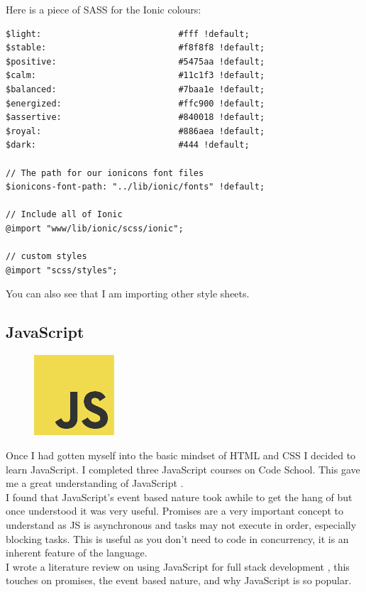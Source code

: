 Here is a piece of SASS for the Ionic colours:
\begin{verbatim}
$light:                           #fff !default;
$stable:                          #f8f8f8 !default;
$positive:                        #5475aa !default; 
$calm:                            #11c1f3 !default;
$balanced:                        #7baa1e !default; 
$energized:                       #ffc900 !default;
$assertive:                       #840018 !default;
$royal:                           #886aea !default;
$dark:                            #444 !default;

// The path for our ionicons font files
$ionicons-font-path: "../lib/ionic/fonts" !default;

// Include all of Ionic
@import "www/lib/ionic/scss/ionic";

// custom styles
@import "scss/styles";
\end{verbatim}
You can also see that I am importing other style sheets.


\subsection{JavaScript}
\begin{figure}
\includegraphics[width=3cm]{img/mobile-app/logos/JS.png}
\end{figure} 
Once I had gotten myself into the basic mindset of HTML and CSS I decided to learn JavaScript.
I completed three JavaScript courses \cite{codeschool_js} on Code  School.
This gave me a great understanding of JavaScript \cite{javascript}.
\\
I found that JavaScript's event based nature took awhile to get the hang of but once understood it was very useful. 
Promises are a very important concept to understand as JS is asynchronous and tasks may not execute in order, especially blocking tasks.
This is useful as you don't need to code in concurrency, it is an inherent feature of the language.
\\
I wrote a literature review on using JavaScript for full stack development \cite{js_advantages_full_stack}, this touches on promises, the event based nature, and why JavaScript is so popular.

